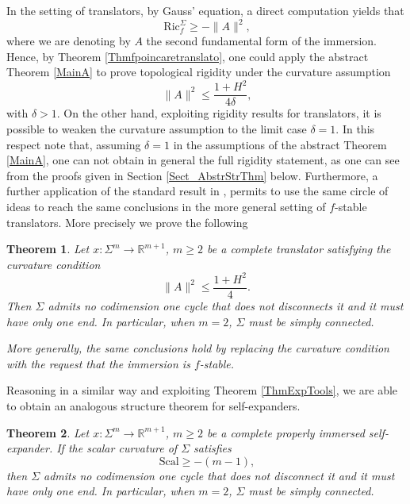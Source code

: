\documentclass[11pt, leqno]{amsart}
\newtheorem{theorem}{Theorem}[section]
\begin{document}
In the setting of translators, by Gauss' equation, a direct computation yields that
\[
\ \mathrm{Ric}_{f}^{\Sigma}\geq -\|A\|^2,
\]
where we are denoting by $A$ the second fundamental form of the immersion. Hence, by Theorem \ref{Thmfpoincaretranslato}, one could apply the abstract Theorem \ref{MainA} to prove topological rigidity under the curvature assumption
\[
\ \|A\|^2\leq \frac{1+H^2}{4\delta},
\]
with $\delta>1$. On the other hand, exploiting rigidity results for translators, it is possible to weaken the curvature assumption to the limit case $\delta=1$. In this respect note that, assuming $\delta=1$ in the assumptions of the abstract Theorem \ref{MainA}, one can not obtain in general the full rigidity statement, as one can see from the proofs given in Section \ref{Sect_AbstrStrThm} below. 
Furthermore, a further application of the standard result in \cite{FCS}, permits to use the same circle of ideas to reach the same conclusions in the more general setting of $f$-stable translators. More precisely we prove the following

\begin{theorem}\label{ThmPoincareTopologyTranslators}
Let $x:\Sigma^{m}\to\mathbb{R}^{m+1}$, $m\geq 2$ be a complete translator satisfying the curvature condition 
\[
\|A\|^2\leq\frac{1+H^2}{4}.
\]
Then $\Sigma$ admits no codimension one cycle that does not disconnects it and it must have only one end. In particular, when $m=2$, $\Sigma$ must be simply connected. 

\noindent More generally, the same conclusions hold by replacing the curvature condition with the request that the immersion is $f$-stable.
\end{theorem}

Reasoning in a similar way and exploiting Theorem \ref{ThmExpTools}, we are able to obtain an analogous structure theorem for self-expanders.

\begin{theorem}\label{ThmPoincareTopologyExpanders}
Let $x:\Sigma^{m}\to\mathbb{R}^{m+1}$, $m\geq 2$ be a complete properly immersed self-expander. If the scalar curvature of $\Sigma$ satisfies 
\[
\ \mathrm{Scal}\geq -(m-1),
\]
then $\Sigma$ admits no codimension one cycle that does not disconnect it and it must have only one end. In particular, when $m=2$, $\Sigma$ must be simply connected.
\end{theorem}
\end{document}
